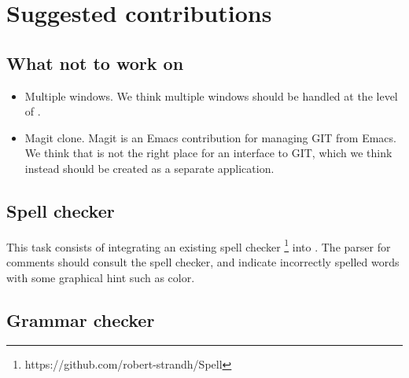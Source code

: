 \chapter{Suggested contributions}

\section{What not to work on}

\begin{itemize}
\item Multiple windows.  We think multiple windows should be handled
  at the level of \mcclim{}.
\item Magit clone.  Magit is an Emacs contribution for managing GIT
  from Emacs.  We think that \sysname{} is not the right place for an
  interface to GIT, which we think instead should be created as a
  separate \clim{} application.
\end{itemize}

\section{Spell checker}

This task consists of integrating an existing spell checker%
\footnote{https://github.com/robert-strandh/Spell}
into \sysname{}.  The parser for \commonlisp{} comments should consult
the spell checker, and indicate incorrectly spelled words with some
graphical hint such as color.

\section{Grammar checker}
